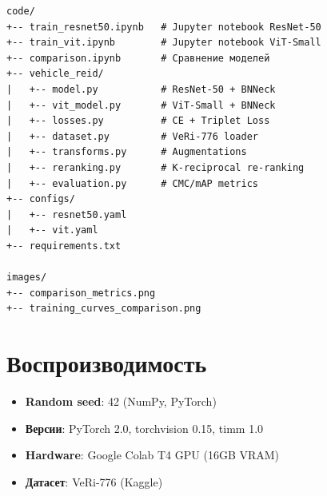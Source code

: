 \begin{verbatim}
code/
+-- train_resnet50.ipynb   # Jupyter notebook ResNet-50
+-- train_vit.ipynb        # Jupyter notebook ViT-Small
+-- comparison.ipynb       # Сравнение моделей
+-- vehicle_reid/
|   +-- model.py           # ResNet-50 + BNNeck
|   +-- vit_model.py       # ViT-Small + BNNeck
|   +-- losses.py          # CE + Triplet Loss
|   +-- dataset.py         # VeRi-776 loader
|   +-- transforms.py      # Augmentations
|   +-- reranking.py       # K-reciprocal re-ranking
|   +-- evaluation.py      # CMC/mAP metrics
+-- configs/
|   +-- resnet50.yaml
|   +-- vit.yaml
+-- requirements.txt

images/
+-- comparison_metrics.png
+-- training_curves_comparison.png
\end{verbatim}

\section{Воспроизводимость}
\label{app:repro}
\begin{itemize}
  \item \textbf{Random seed}: 42 (NumPy, PyTorch)
  \item \textbf{Версии}: PyTorch 2.0, torchvision 0.15, timm 1.0
  \item \textbf{Hardware}: Google Colab T4 GPU (16GB VRAM)
  \item \textbf{Датасет}: VeRi-776 (Kaggle)
\end{itemize}

